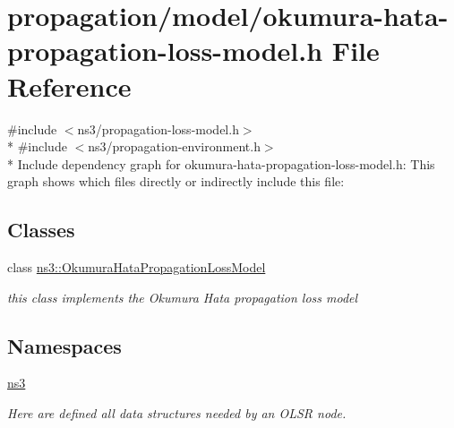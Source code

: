 \hypertarget{okumura-hata-propagation-loss-model_8h}{}\section{propagation/model/okumura-\/hata-\/propagation-\/loss-\/model.h File Reference}
\label{okumura-hata-propagation-loss-model_8h}
{\ttfamily \#include $<$ns3/propagation-\/loss-\/model.\+h$>$}\\*
{\ttfamily \#include $<$ns3/propagation-\/environment.\+h$>$}\\*
Include dependency graph for okumura-\/hata-\/propagation-\/loss-\/model.h\+:
This graph shows which files directly or indirectly include this file\+:
\subsection*{Classes}
\begin{DoxyCompactItemize}
\item 
class \hyperlink{classns3_1_1OkumuraHataPropagationLossModel}{ns3\+::\+Okumura\+Hata\+Propagation\+Loss\+Model}
\begin{DoxyCompactList}\small\item\em this class implements the Okumura Hata propagation loss model \end{DoxyCompactList}\end{DoxyCompactItemize}
\subsection*{Namespaces}
\begin{DoxyCompactItemize}
\item 
 \hyperlink{namespacens3}{ns3}
\begin{DoxyCompactList}\small\item\em Here are defined all data structures needed by an O\+L\+SR node. \end{DoxyCompactList}\end{DoxyCompactItemize}
